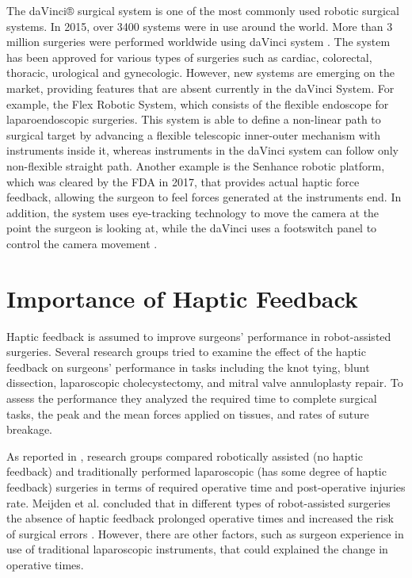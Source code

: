 The daVinci® surgical system is one of the most commonly used robotic surgical systems. In 2015, over 3400 systems were in use around the world. More than 3 million surgeries were performed worldwide using daVinci system \cite{_intuitive_2018}. The system has been approved for various types of surgeries such as cardiac, colorectal, thoracic, urological and gynecologic. However, new systems are emerging on the market, providing features that are absent currently in the daVinci System. For example, the Flex Robotic System, which consists of the flexible endoscope for laparoendoscopic surgeries. This system is able to define a non-linear path to surgical target by advancing a flexible telescopic inner-outer mechanism with instruments inside it, whereas instruments in the daVinci system can follow only non-flexible straight path. Another example is the Senhance robotic platform, which was cleared by the FDA in 2017, that provides actual haptic force feedback, allowing the surgeon to feel forces generated at the instruments end. In addition, the system uses eye-tracking technology to move the camera at the point the surgeon is looking at, while the daVinci uses a footswitch panel to control the camera movement \cite{peters_review_2018}.



\section{Importance of Haptic Feedback}
\label{sec:hapticFeedbackImportance}

Haptic feedback is assumed to improve surgeons' performance in robot-assisted surgeries. Several research groups tried to examine the effect of the haptic feedback on surgeons' performance in tasks including the knot tying, blunt dissection, laparoscopic cholecystectomy, and mitral valve annuloplasty repair. To assess the performance they analyzed the required time to complete surgical tasks, the peak and the mean forces applied on tissues, and rates of suture breakage.

As reported in \cite{meijden_value_2009}, research groups \cite{delaney_comparison_2003, morino_randomized_2006, nakadi_evaluation_2006, kornprat_prospective_2006} compared robotically assisted (no haptic feedback) and traditionally performed laparoscopic (has some degree of haptic feedback) surgeries in terms of required operative time and post-operative injuries rate. Meijden et al. concluded that in different types of robot-assisted surgeries the absence of haptic feedback prolonged operative times and increased the risk of surgical errors \cite{meijden_value_2009}. However, there are other factors, such as surgeon experience in use of traditional laparoscopic instruments, that could explained the change in operative times.

